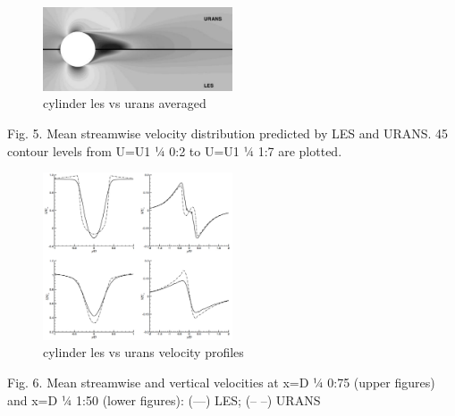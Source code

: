 \documentclass[journal]{new-aiaa}
\begin{document}
\begin{figure}[H]
\begin{center}
\includegraphics[width=0.5\textwidth]{Images/logan/catalano_2003numerical_SteadyURANSvsLES.pdf}
\caption{ cylinder les vs urans averaged \cite{catalano2003numerical} }
\label{fig:lesvsuranscylinderaveraged}
\end{center}
\end{figure}

Fig. 5. Mean streamwise velocity distribution predicted by LES and URANS. 45 contour levels from U=U1 1⁄4  0:2 to U=U1 1⁄4 1:7 are plotted.

\begin{figure}[H]
\begin{center}
\includegraphics[width=0.5\textwidth]{Images/logan/catalano_2003numerical_VelocityProfiles.pdf}
\caption{ cylinder les vs urans velocity profiles \cite{catalano2003numerical} }
\label{fig:lesvsuranscylindervelprofile}
\end{center}
\end{figure}

Fig. 6. Mean streamwise and vertical velocities at x=D 1⁄4 0:75 (upper figures) and x=D 1⁄4 1:50 (lower figures): (—) LES; (– –) URANS
\end{document}
